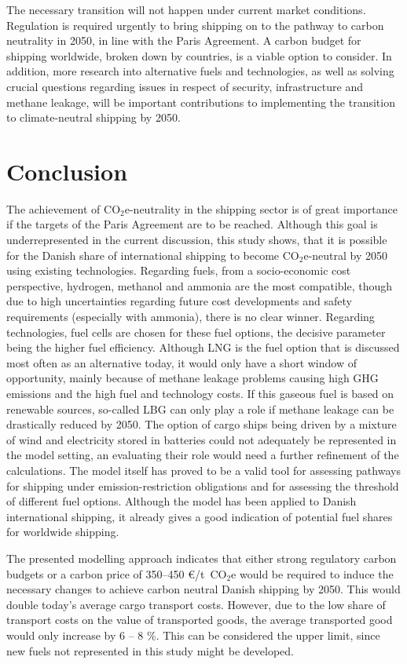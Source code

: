 \documentclass[article]{elsarticle}
\begin{document}
The necessary transition will not happen under current market conditions. Regulation is required urgently to bring shipping on to the pathway to carbon neutrality in 2050, in line with the Paris Agreement. A carbon budget for shipping worldwide, broken down by countries, is a viable option to consider. In addition, more research into alternative fuels and technologies, as well as solving crucial questions regarding issues in respect of security, infrastructure and methane leakage, will be important contributions to implementing the transition to climate-neutral shipping by 2050. 


\section{Conclusion}
\label{sec:Conclusion}
The achievement of CO$_2$e-neutrality in the shipping sector is of great importance if the targets of the Paris Agreement are to be reached. Although this goal is underrepresented in the current discussion, this study shows, that it is possible for the Danish share of international shipping to become CO$_2$e-neutral by 2050 using existing technologies. Regarding fuels, from a socio-economic cost perspective, hydrogen, methanol and ammonia are the most compatible, though due to high uncertainties regarding future cost developments and safety requirements (especially with ammonia), there is no clear winner. Regarding technologies, fuel cells are chosen for these fuel options, the decisive parameter being the higher fuel efficiency. Although LNG is the fuel option that is discussed most often as an alternative today, it would only have a short window of opportunity, mainly because of methane leakage problems causing high GHG emissions and the high fuel and technology costs. If this gaseous fuel is based on renewable sources, so-called LBG can only play a role if methane leakage can be drastically reduced by 2050. The option of cargo ships being driven by a mixture of wind and electricity stored in batteries could not adequately be represented in the model setting, an evaluating their role would need a further refinement of the calculations. The model itself has proved to be a valid tool for assessing pathways for shipping under emission-restriction obligations and for assessing the threshold of different fuel options. Although the model has been applied to Danish international shipping, it already gives a good indication of potential fuel shares for worldwide shipping.
 
The presented modelling approach indicates that either strong regulatory carbon budgets or a carbon price of 350--450 \euro/t~CO$_2$e would be required to induce the necessary changes to achieve carbon neutral Danish shipping by 2050. This would double today's average cargo transport costs. However, due to the low share of transport costs on the value of transported goods, the average transported good would only increase by 6 -- 8 \%. This can be considered the upper limit, since new fuels not represented in this study might be developed.
\end{document}
